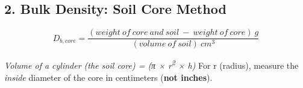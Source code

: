 \documentclass[
  letterpaper,
  twocolumn,
  portrait]{scrbook}
\begin{document}
\hypertarget{bulk-density-soil-core-method}{%
\subsection{2. Bulk Density: Soil Core
Method}\label{bulk-density-soil-core-method}}

\[
D_{b,core}=\frac{(weight\ of\ core\ and\ soil\ -\ weight\ of\ core)\ g}{(volume\ of\ soil)\ cm^{3}}
\]

\emph{Volume of a cylinder (the soil core) = (π × r\textsuperscript{2} ×
h)} For r (radius), measure the \emph{inside} diameter of the core in
centimeters (\textbf{not inches}).

 
  \providecommand{\huxb}[2]{\arrayrulecolor[RGB]{#1}\global\arrayrulewidth=#2pt}
  \providecommand{\huxvb}[2]{\color[RGB]{#1}\vrule width #2pt}
  \providecommand{\huxtpad}[1]{\rule{0pt}{#1}}
  \providecommand{\huxbpad}[1]{\rule[-#1]{0pt}{#1}}
\end{document}
